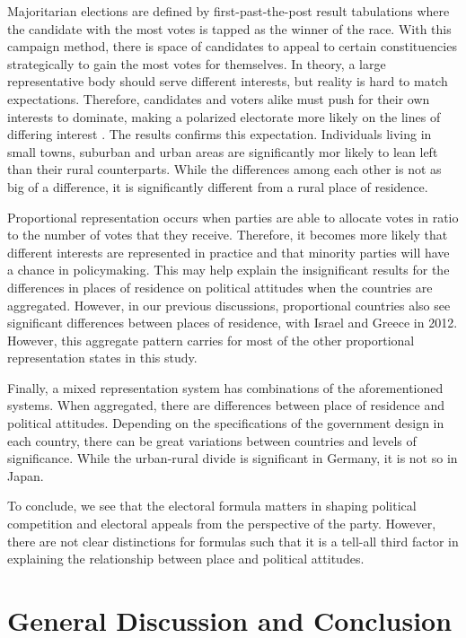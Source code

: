 \documentclass[12pt, titlepage]{article}
\begin{document}
Majoritarian elections are defined by first-past-the-post result tabulations where the candidate with the most votes is tapped as the winner of the race. With this campaign method, there is space of candidates to appeal to certain constituencies strategically to gain the most votes for themselves. In theory, a large representative body should serve different interests, but reality is hard to match expectations. Therefore, candidates and voters alike must push for their own interests to dominate, making a polarized electorate more likely on the lines of differing interest \cite{abramowitz-2010}. The results confirms this expectation. Individuals living in small towns, suburban and urban areas are significantly mor likely to lean left than their rural counterparts. While the differences among each other is not as big of a difference, it is significantly different from a rural place of residence. 

Proportional representation occurs when parties are able to allocate votes in ratio to the number of votes that they receive. Therefore, it becomes more likely that different interests are represented in practice and that minority parties will have a chance in policymaking. This may help explain the insignificant results for the differences in places of residence on political attitudes when the countries are aggregated. However, in our previous discussions, proportional countries also see significant differences between places of residence, with Israel and Greece in 2012. However, this aggregate pattern carries for most of the other proportional representation states in this study.

Finally, a mixed representation system has combinations of the aforementioned systems. When aggregated, there are differences between place of residence and political attitudes. Depending on the specifications of the government design in each country, there can be great variations between countries and levels of significance. While the urban-rural divide is significant in Germany, it is not so in Japan. 

To conclude, we see that the electoral formula matters in shaping political competition and electoral appeals from the perspective of the party. However, there are not clear distinctions for formulas such that it is a tell-all third factor in explaining the relationship between place and political attitudes. 

\section{General Discussion and Conclusion}
\end{document}
